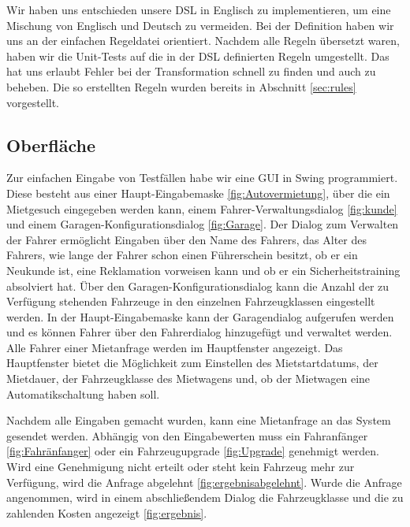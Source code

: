 Wir haben uns entschieden unsere DSL in Englisch zu implementieren, um eine Mischung
von Englisch und Deutsch zu vermeiden. Bei der Definition haben wir uns an der
einfachen Regeldatei orientiert. Nachdem alle Regeln übersetzt waren, haben wir
die Unit-Tests auf die in der DSL definierten Regeln umgestellt. Das hat uns erlaubt
Fehler bei der Transformation schnell zu finden und auch zu beheben. Die so erstellten
Regeln wurden bereits in Abschnitt \ref{sec:rules} vorgestellt.

\subsection{Oberfläche}
Zur einfachen Eingabe von Testfällen habe wir eine GUI in Swing programmiert.
Diese besteht aus einer Haupt-Eingabemaske \ref{fig:Autovermietung},
über die ein Mietgesuch eingegeben werden kann, einem Fahrer-Verwaltungsdialog \ref{fig:kunde} 
und einem Garagen-Konfigurationsdialog \ref{fig:Garage}.
Der Dialog zum Verwalten der Fahrer ermöglicht Eingaben über den Name des Fahrers,
das Alter des Fahrers, wie lange der Fahrer schon einen Führerschein besitzt, 
ob er ein Neukunde ist, eine Reklamation vorweisen kann und ob er ein Sicherheitstraining absolviert hat.
Über den Garagen-Konfigurationsdialog kann die Anzahl der zu Verfügung stehenden Fahrzeuge in den einzelnen Fahrzeugklassen eingestellt werden. 
In der Haupt-Eingabemaske kann der Garagendialog aufgerufen werden und es können Fahrer über den Fahrerdialog hinzugefügt und verwaltet werden.
Alle Fahrer einer Mietanfrage werden im Hauptfenster angezeigt.
Das Hauptfenster bietet die Möglichkeit zum Einstellen des Mietstartdatums, der Mietdauer, der Fahrzeugklasse des Mietwagens und, ob der Mietwagen eine Automatikschaltung haben soll. 

Nachdem alle Eingaben gemacht wurden, kann eine Mietanfrage an das System gesendet werden. Abhängig von den Eingabewerten muss ein Fahranfänger \ref{fig:Fahränfanger} oder ein Fahrzeugupgrade \ref{fig:Upgrade} genehmigt werden. Wird eine Genehmigung nicht erteilt oder steht kein Fahrzeug mehr zur Verfügung, wird die Anfrage abgelehnt \ref{fig:ergebnisabgelehnt}.
Wurde die Anfrage angenommen, wird in einem abschließendem Dialog die Fahrzeugklasse und die zu zahlenden Kosten angezeigt \ref{fig:ergebnis}.


